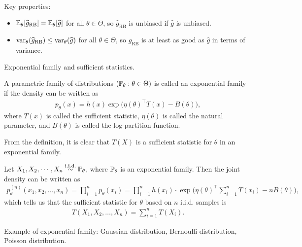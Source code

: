 \documentclass[11pt,letterpaper]{article}
\numberwithin{assumption}{lecture}
\numberwithin{theorem}{lecture}
\numberwithin{proposition}{lecture}
\numberwithin{lemma}{lecture}
\numberwithin{claim}{lecture}
\numberwithin{corollary}{lecture}
\numberwithin{definition}{lecture}
\numberwithin{conjecture}{lecture}
\numberwithin{remark}{lecture}
\numberwithin{example}{lecture}
\numberwithin{equation}{lecture}
\begin{document}
Key properties:
\begin{itemize}
  \item ${\mathbb{E}}_\theta [\widehat{g}_{\mathrm{RB}}] = {\mathbb{E}}_\theta [\widehat{g}]$ for all $\theta \in \Theta$, so $\widehat{g}_{\mathrm{RB}}$ is unbiased if $\widehat{g}$ is unbiased.
  \item $\operatorname{var}_\theta (\widehat{g}_{\mathrm{RB}}) \leq \operatorname{var}_\theta (\widehat{g})$ for all $\theta \in \Theta$, so $\widehat{g}_{\mathrm{RB}}$ is at least as good as $\widehat{g}$ in terms of variance.
\end{itemize}
Exponential family and sufficient statistics.
\begin{definition}
  A parametric family of distributions $({\mathbb{P}}_\theta: \theta \in \Theta)$ is called an exponential family if the density can be written as
  \begin{align*}
    p_\theta (x) = h(x) \exp \Big( \eta(\theta)^\top T(x) - B (\theta) \Big),
  \end{align*}
  where $T(x)$ is called the sufficient statistic, $\eta(\theta)$ is called the natural parameter, and $B (\theta)$ is called the log-partition function.
\end{definition}
From the definition, it is clear that $T(X)$ is a sufficient statistic for $\theta$ in an exponential family.

Let $X_1, X_2, \cdots, X_n \overset{\mathrm{i.i.d.}}{\sim} {\mathbb{P}}_\theta$, where ${\mathbb{P}}_\theta$ is an exponential family. Then the joint density can be written as
\begin{align*}
  p_\theta^{(n)}(x_1, x_2, \ldots, x_n) = \prod_{i=1}^n p_\theta(x_i) = \prod_{i=1}^n h(x_i) \cdot  \exp \Big( \eta(\theta)^\top \sum_{i = 1}^n T(x_i) - n B (\theta) \Big),
\end{align*}
which tells us that the sufficient statistic for $\theta$ based on $n$ i.i.d. samples is
\begin{align*}
  T(X_1, X_2, \ldots, X_n) = \sum_{i = 1}^n T(X_i).
\end{align*}

Example of exponential family: Gaussian distribution, Bernoulli distribution, Poisson distribution.

\bigskip
\end{document}
